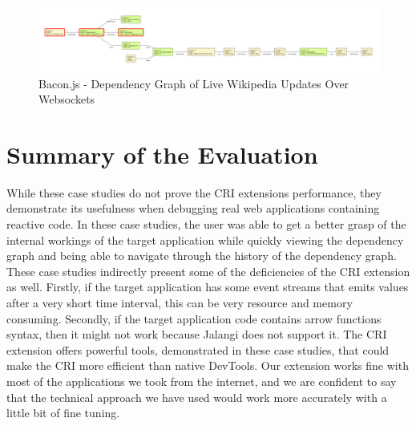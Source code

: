 \begin{figure}[!h]
	\centering
	\includegraphics[width=\textwidth,height=\textheight,keepaspectratio]{gfx/evaluation/dgraph_wpedia_updates.png}
	\caption{Bacon.js - Dependency Graph of Live Wikipedia Updates Over Websockets}
	\label{fig:dgraph_wpedia_updates}
\end{figure}

\section{Summary of the Evaluation}
While these case studies do not prove the CRI extension\textquotesingle s performance, they demonstrate its usefulness when debugging real web applications containing reactive code. In these case studies, the user was able to get a better grasp of the internal workings of the target application while quickly viewing the dependency graph and being able to navigate through the history of the dependency graph. 
These case studies indirectly present some of the deficiencies of the CRI extension as well. Firstly, if the target application has some event streams that emits values after a very short time interval, this can be very resource and memory consuming. Secondly, if the target application code contains arrow functions syntax, then it might not work because Jalangi does not support it.
The CRI extension offers powerful tools, demonstrated in these case studies, that could make the CRI more efficient than native DevTools. Our extension works fine with most of the applications we took from the internet, and we are confident to say that the technical approach we have used would work more accurately with a little bit of fine tuning.